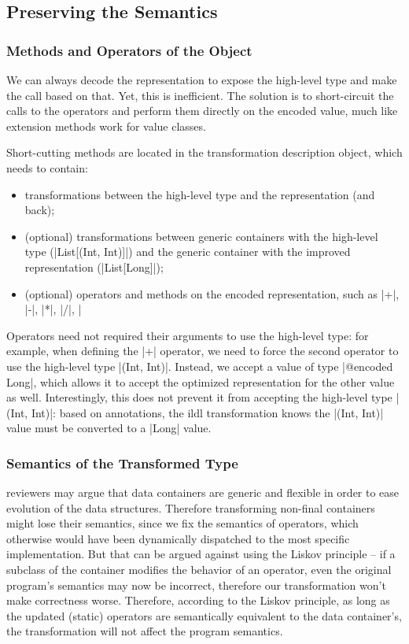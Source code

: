 \subsection{Preserving the Semantics}
\label{sec:ildl:semantics}

\subsubsection{Methods and Operators of the Object}
We can always decode the representation to expose the high-level type and make the call based on that. Yet, this is inefficient. The solution is to short-circuit the calls to the operators and perform them directly on the encoded value, much like extension methods work for value classes.

Short-cutting methods are located in the transformation description object, which needs to contain:
\begin{itemize}
  \item transformations between the high-level type and the representation (and back);
  \item (optional) transformations between generic containers with the high-level type (|List[(Int, Int)]|) and the generic container with the improved representation (|List[Long]|);
  \item (optional) operators and methods on the encoded representation, such as |+|, |-|, |*|, |/|, |%
\end{itemize}

Operators need not required their arguments to use the high-level type: for example, when defining the |+| operator, we need to force the second operator to use the high-level type |(Int, Int)|. Instead, we accept a value of type |@encoded Long|, which allows it to accept the optimized representation for the other value as well. Interestingly, this does not prevent it from accepting the high-level type |(Int, Int)|: based on annotations, the ildl transformation knows the |(Int, Int)| value must be converted to a |Long| value.

\subsubsection{Semantics of the Transformed Type}
reviewers may argue that data containers are generic and flexible in order to ease evolution of the data structures. Therefore transforming non-final containers might lose their semantics, since we fix the semantics of operators, which otherwise would have been dynamically dispatched to the most specific implementation. But that can be argued against using the Liskov principle -- if a subclass of the container modifies the behavior of an operator, even the original program's semantics may now be incorrect, therefore our transformation won't make correctness worse. Therefore, according to the Liskov principle, as long as the updated (static) operators are semantically equivalent to the data container's, the transformation will not affect the program semantics.

